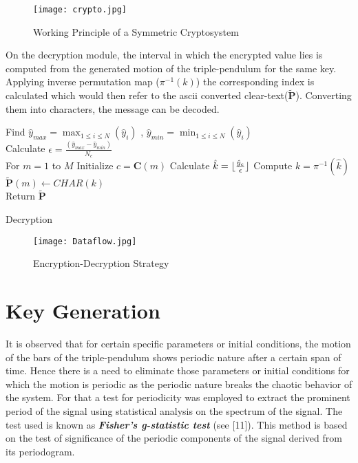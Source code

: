 \begin{figure}[H]
\centering
\texttt{[image: crypto.jpg]}
\caption{Working Principle of a Symmetric Cryptosystem}\label{fig:crypto}
\end{figure}

On the decryption module, the interval in which the encrypted value lies is computed from the generated motion of the triple-pendulum for the same key. Applying inverse permutation map ($\pi^{-1}(k)$) the corresponding index is calculated which would then refer to the ascii converted clear-text($\tilde{\textbf{P}}$). Converting them into characters, the message can be decoded.\\

\begin{algorithm}
\DontPrintSemicolon %
Find $\hat{y}_{max} = \max_{1 \leq i \leq N}(\hat{y}_{i})$ , $\hat{y}_{min}=\min_{1 \leq i \leq N}(\hat{y}_{i})$\\
Calculate $\epsilon = \frac{(\hat{y}_{max} - \hat{y}_{min})}{N_{c}}$\\
For $m = 1$ to $M$\linebreak
 Initialize $c = \textbf{C}(m)$ \linebreak
 Calculate $\hat{k} = \lfloor\frac{\hat{y}_{c}}{\epsilon}\rfloor$\linebreak 
 Compute $ k = \pi^{-1}(\hat{k})$\linebreak
 $\tilde{\textbf{P}}(m) \leftarrow CHAR(k)$\\
Return $\tilde{\textbf{P}}$
\caption{Decryption}
\label{algo:decrypt}
\end{algorithm}

\begin{figure}[H]
\centering
\texttt{[image: Dataflow.jpg]}
\caption{Encryption-Decryption Strategy}\label{fig:Dataflow}
\end{figure}



\section{Key Generation}
It is observed that for certain specific parameters or initial conditions, the motion of the bars of the triple-pendulum shows periodic nature after a certain span of time. Hence there is a need to eliminate those parameters or initial conditions for which the motion is periodic as the periodic nature breaks the chaotic behavior of the system. For that a test for periodicity was employed to extract the prominent period of the signal using statistical analysis on the spectrum of the signal. The test used is known as {\bf{\em Fisher's g-statistic test}} (see [11]). This method is based on the test of significance of the periodic components of the signal derived from its periodogram. 

